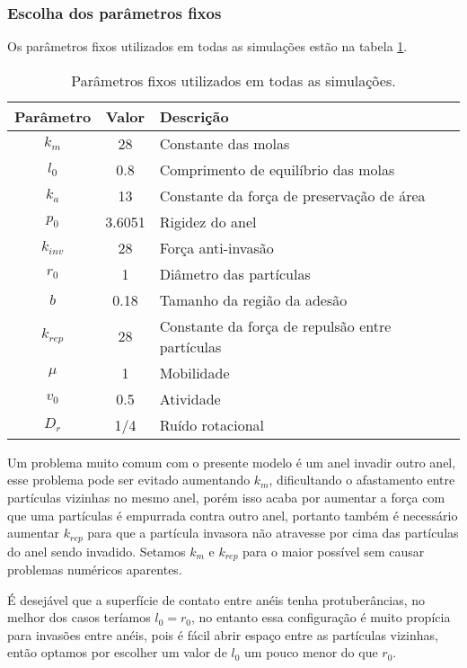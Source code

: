 \documentclass{article}
\theoremstyle{definition}
\begin{document}
\subsubsection{Escolha dos parâmetros fixos}
Os parâmetros fixos utilizados em todas as simulações estão na tabela \ref{tab:fix_pars}.
\begin{table}[h]
    \centering
    \begin{tabular}{||c|c|l||}
        \hline
        Parâmetro & Valor & Descrição \\
        \hline \hline
        $k_m$ & 28 & Constante das molas \\
        \hline
        $l_0$ & 0.8 & Comprimento de equilíbrio das molas \\
        \hline
        $k_a$ & 13 & Constante da força de preservação de área \\
        \hline
        $p_0$ & 3.6051 & Rigidez do anel \\
        \hline
        $k_{inv}$ & 28 & Força anti-invasão \\
        \hline
        $r_0$ & 1 & Diâmetro das partículas \\
        \hline
        $b$ & 0.18 & Tamanho da região da adesão \\
        \hline
        $k_{rep}$ & 28 & Constante da força de repulsão entre partículas \\
        \hline
        $\mu$ & 1 & Mobilidade \\
        \hline
        $v_0$ & 0.5 & Atividade \\
        \hline
        $D_r$ & 1/4 & Ruído rotacional \\
        \hline
    \end{tabular}
    \caption{Parâmetros fixos utilizados em todas as simulações.}
    \label{tab:fix_pars}
\end{table}

Um problema muito comum com o presente modelo é um anel invadir outro anel, esse problema pode ser evitado aumentando $k_m$, dificultando o afastamento entre partículas vizinhas no mesmo anel, porém isso acaba por aumentar a força com que uma partículas é empurrada contra outro anel, portanto também é necessário aumentar $k_{rep}$ para que a partícula invasora não atravesse por cima das partículas do anel sendo invadido. Setamos $k_m$ e $k_{rep}$ para o maior possível sem causar problemas numéricos aparentes.

É desejável que a superfície de contato entre anéis tenha protuberâncias, no melhor dos casos teríamos $l_0 = r_0$, no entanto essa configuração é muito propícia para invasões entre anéis, pois é fácil abrir espaço entre as partículas vizinhas, então optamos por escolher um valor de $l_0$ um pouco menor do que $r_0$.
\end{document}
